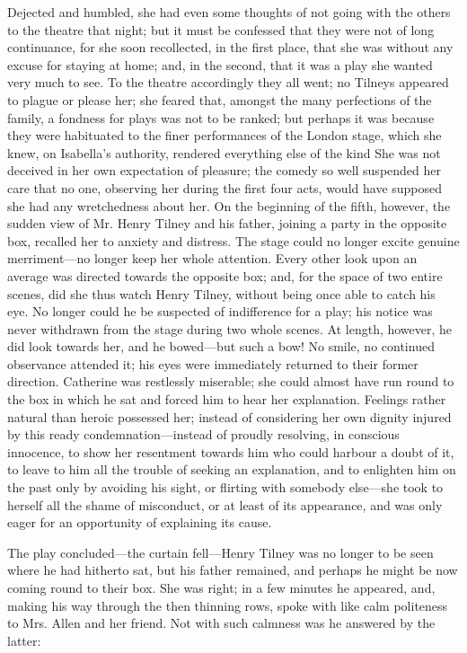 Dejected and humbled, she had even some thoughts of not going with the others to the theatre that night; but it must be confessed that they were not of long continuance, for she soon recollected, in the first place, that she was without any excuse for staying at home; and, in the second, that it was a play she wanted very much to see. To the theatre accordingly they all went; no Tilneys appeared to plague or please her; she feared that, amongst the many perfections of the family, a fondness for plays was not to be ranked; but perhaps it was because they were habituated to the finer performances of the London stage, which she knew, on Isabella's authority, rendered everything else of the kind  She was not deceived in her own expectation of pleasure; the comedy so well suspended her care that no one, observing her during the first four acts, would have supposed she had any wretchedness about her. On the beginning of the fifth, however, the sudden view of Mr. Henry Tilney and his father, joining a party in the opposite box, recalled her to anxiety and distress. The stage could no longer excite genuine merriment---no longer keep her whole attention. Every other look upon an average was directed towards the opposite box; and, for the space of two entire scenes, did she thus watch Henry Tilney, without being once able to catch his eye. No longer could he be suspected of indifference for a play; his notice was never withdrawn from the stage during two whole scenes. At length, however, he did look towards her, and he bowed---but such a bow! No smile, no continued observance attended it; his eyes were immediately returned to their former direction. Catherine was restlessly miserable; she could almost have run round to the box in which he sat and forced him to hear her explanation. Feelings rather natural than heroic possessed her; instead of considering her own dignity injured by this ready condemnation---instead of proudly resolving, in conscious innocence, to show her resentment towards him who could harbour a doubt of it, to leave to him all the trouble of seeking an explanation, and to enlighten him on the past only by avoiding his sight, or flirting with somebody else---she took to herself all the shame of misconduct, or at least of its appearance, and was only eager for an opportunity of explaining its cause.

The play concluded---the curtain fell---Henry Tilney was no longer to be seen where he had hitherto sat, but his father remained, and perhaps he might be now coming round to their box. She was right; in a few minutes he appeared, and, making his way through the then thinning rows, spoke with like calm politeness to Mrs. Allen and her friend. Not with such calmness was he answered by the latter: 

